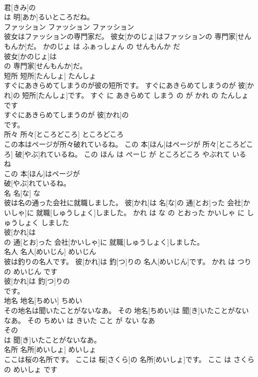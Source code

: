 \documentclass[8pt]{extreport}
\begin{document}
\begin{CJK}{UTF8}{min}
\\	君[きみ]の
\\	は 明[あか]るいところだね。			
\\	ファッション	ファッション	ファッション	
\\	彼女はファッションの専門家だ。	彼女[かのじょ]はファッションの 専門家[せんもんか]だ。	かのじょ は ふぁっしょん の せんもんか だ	
\\	彼女[かのじょ]は
\\	の 専門家[せんもんか]だ。			
\\	短所	短所[たんしょ]	たんしょ	
\\	すぐにあきらめてしまうのが彼の短所です。	すぐにあきらめてしまうのが 彼[かれ]の 短所[たんしょ]です。	すぐ に あきらめて しまう の が かれ の たんしょ です	
\\	すぐにあきらめてしまうのが 彼[かれ]の
\\	です。			
\\	所々	所々[ところどころ]	ところどころ	
\\	この本はページが所々破れているね。	この 本[ほん]はページが 所々[ところどころ] 破[やぶ]れているね。	この ほん は ぺーじ が ところどころ やぶれて いる ね	
\\	この 本[ほん]はページが
\\	破[やぶ]れているね。			
\\	名	名[な]	な	
\\	彼は名の通った会社に就職しました。	彼[かれ]は 名[な]の 通[とお]った 会社[かいしゃ]に 就職[しゅうしょく]しました。	かれ は な の とおった かいしゃ に しゅうしょく しました	
\\	彼[かれ]は
\\	の 通[とお]った 会社[かいしゃ]に 就職[しゅうしょく]しました。			
\\	名人	名人[めいじん]	めいじん	
\\	彼は釣りの名人です。	彼[かれ]は 釣[つ]りの 名人[めいじん]です。	かれ は つり の めいじん です	
\\	彼[かれ]は 釣[つ]りの
\\	です。			
\\	地名	地名[ちめい]	ちめい	
\\	その地名は聞いたことがないなあ。	その 地名[ちめい]は 聞[き]いたことがないなあ。	その ちめい は きいた こと が ない なあ	
\\	その
\\	は 聞[き]いたことがないなあ。			
\\	名所	名所[めいしょ]	めいしょ	
\\	ここは桜の名所です。	ここは 桜[さくら]の 名所[めいしょ]です。	ここ は さくら の めいしょ です	

\end{CJK}
\end{document}
